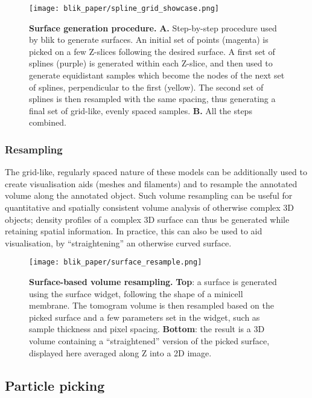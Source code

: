 \begin{figure}[!ht]
    \centering
    \texttt{[image: blik\_paper/spline\_grid\_showcase.png]}
    \caption[Surface generation procedure]{\textbf{Surface generation procedure.} \textbf{A.} Step-by-step procedure used by blik to generate surfaces. An initial set of points (magenta) is picked on a few Z-slices following the desired surface. A first set of splines (purple) is generated within each Z-slice, and then used to generate equidistant samples which become the nodes of the next set of splines, perpendicular to the first (yellow). The second set of splines is then resampled with the same spacing, thus generating a final set of grid-like, evenly spaced samples. \textbf{B.} All the steps combined.}
    \label{surface-pick}
\end{figure}

\subsubsection{Resampling}\label{resampling}
The grid-like, regularly spaced nature of these models can be additionally used to create visualisation aids (meshes and filaments) and to resample the annotated volume along the annotated object. Such volume resampling can be useful for quantitative and spatially consistent volume analysis of otherwise complex 3D objects; density profiles of a complex 3D surface can thus be generated while retaining spatial information. In practice, this can also be used to aid visualisation, by ``straightening'' an otherwise curved surface.

\begin{figure}[!ht]
    \centering
    \texttt{[image: blik\_paper/surface\_resample.png]}
    \caption[Surface-based volume resampling]{\textbf{Surface-based volume resampling.} \textbf{Top}: a surface is generated using the surface widget, following the shape of a minicell membrane. The tomogram volume is then resampled based on the picked surface and a few parameters set in the widget, such as sample thickness and pixel spacing. \textbf{Bottom}: the result is a 3D volume containing a ``straightened'' version of the picked surface, displayed here averaged along Z into a 2D image.}
    \label{surface-resample}
\end{figure}

\subsection{Particle picking}\label{particle-picking}

